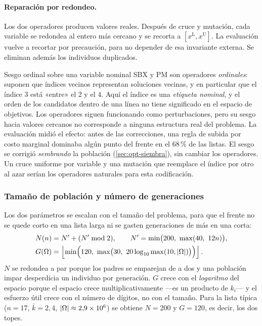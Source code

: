 \paragraph{Reparación por redondeo.} Los dos operadores producen valores
reales. Después de cruce y mutación, cada variable se redondea al entero más
cercano y se recorta a $[x^{\mathrm{L}},x^{\mathrm{U}}]$. La evaluación vuelve
a recortar por precaución, para no depender de esa invariante externa. Se
eliminan además los individuos duplicados.

\begin{hallazgo}{Sesgo ordinal sobre una variable nominal}
SBX y PM son operadores \emph{ordinales}: suponen que índices vecinos
representan soluciones vecinas, y en particular que el índice 3 está «entre»
el 2 y el 4. Aquí el índice es una \emph{etiqueta nominal}, y el orden de los
candidatos dentro de una línea no tiene significado en el espacio de
objetivos. Los operadores siguen funcionando como perturbaciones, pero su
sesgo hacia valores cercanos no corresponde a ninguna estructura real del
problema. La evaluación midió el efecto: antes de las correcciones, una regla
de subida por costo marginal dominaba algún punto del frente en el 68\,\% de
las listas. El sesgo se corrigió \emph{sembrando} la población
(\cref{sec:opt-siembra}), sin cambiar los operadores. Un cruce uniforme por
variable y una mutación que reemplace el índice por otro al azar serían los
operadores naturales para esta codificación.
\end{hallazgo}

\subsubsection{Tamaño de población y número de generaciones}

Los dos parámetros se escalan con el tamaño del problema, para que el frente no
se quede corto en una lista larga ni se gasten generaciones de más en una
corta:
\begin{align*}
  N(n)&=N'+(N'\bmod 2),\qquad N'=\min\bigl(200,\ \max(40,\ 12n)\bigr),\\
  G(\Esp)&=\piso{\min\Bigl(120,\ \max\bigl(30,\ 20\log_{10}\max(10,\card{\Esp})\bigr)\Bigr)}.
\end{align*}
$N$ se redondea a par porque los padres se emparejan de a dos y una población
impar desperdicia un individuo por generación. $G$ crece con el
\emph{logaritmo} del espacio porque el espacio crece multiplicativamente
---es un producto de $k_i$--- y el esfuerzo útil crece con el número de
dígitos, no con el tamaño. Para la lista típica ($n=17$, $\bar k=2{,}4$,
$\left\lvert \Omega \right\rvert\approx2{,}9\times10^6$) se obtiene $N=200$ y $G=120$, es decir,
los dos topes.

